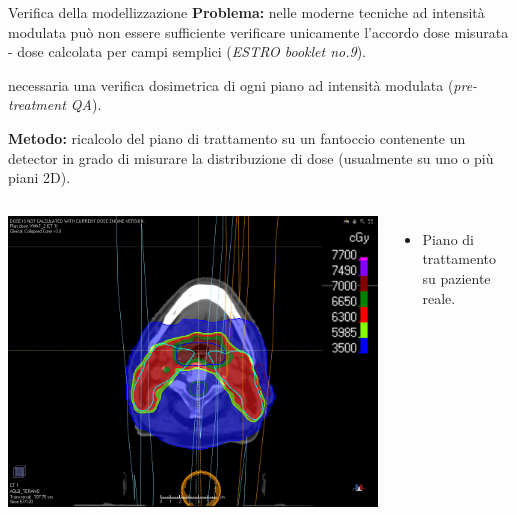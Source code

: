 \documentclass{beamer}
\begin{document}
\begin{frame}{Verifica della modellizzazione}
\scriptsize
\alert{\bf Problema:} nelle moderne tecniche ad intensità modulata può non essere sufficiente  verificare unicamente l'accordo dose misurata - dose calcolata per campi semplici (\textit{ESTRO booklet no.9}).\\ \vspace{.3cm}

 necessaria una verifica dosimetrica di ogni piano ad intensità modulata (\textit{pre-treatment QA}).\\ \vspace{.3cm}

{\color{Dgreen} \bf Metodo:} ricalcolo del piano di trattamento su un fantoccio contenente un detector in grado di misurare la distribuzione di dose (usualmente su uno o più piani 2D).\\ \vspace{.3cm}

\begin{columns}
\centering
\includegraphics[width=.8\textwidth]{./img/Pzt.png}
\begin{itemize}
\tiny
\item Piano di trattamento su paziente reale.
\end{itemize}


\end{columns}
\end{frame}
\end{document}
